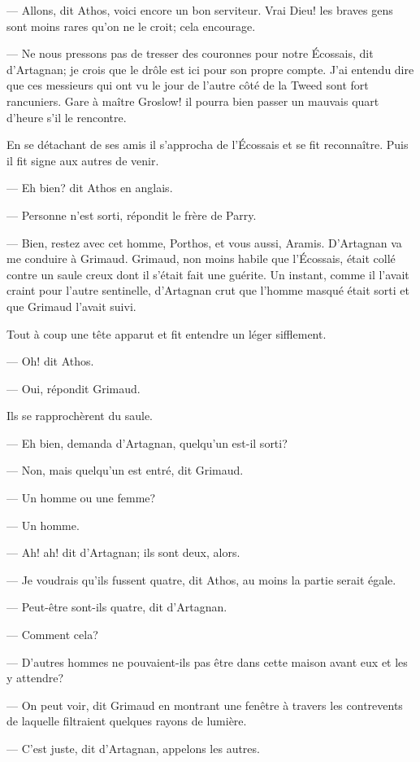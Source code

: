 — Allons, dit Athos, voici encore un bon serviteur. Vrai Dieu! les braves gens sont moins rares qu'on ne le croit; cela encourage.

— Ne nous pressons pas de tresser des couronnes pour notre Écossais, dit d'Artagnan; je crois que le drôle est ici pour son propre compte. J'ai entendu dire que ces messieurs qui ont vu le jour de l'autre côté de la Tweed sont fort rancuniers. Gare à maître Groslow! il pourra bien passer un mauvais quart d'heure s'il le rencontre.

En se détachant de ses amis il s'approcha de l'Écossais et se fit reconnaître. Puis il fit signe aux autres de venir.

— Eh bien? dit Athos en anglais.

— Personne n'est sorti, répondit le frère de Parry.

— Bien, restez avec cet homme, Porthos, et vous aussi, Aramis. D'Artagnan va me conduire à Grimaud.
Grimaud, non moins habile que l'Écossais, était collé contre un saule creux dont il s'était fait une guérite. Un instant, comme il l'avait craint pour l'autre sentinelle, d'Artagnan crut que l'homme masqué était sorti et que Grimaud l'avait suivi.

Tout à coup une tête apparut et fit entendre un léger sifflement.

— Oh! dit Athos.

— Oui, répondit Grimaud.

Ils se rapprochèrent du saule.

— Eh bien, demanda d'Artagnan, quelqu'un est-il sorti?

— Non, mais quelqu'un est entré, dit Grimaud.

— Un homme ou une femme?

— Un homme.

— Ah! ah! dit d'Artagnan; ils sont deux, alors.

— Je voudrais qu'ils fussent quatre, dit Athos, au moins la partie serait égale.

— Peut-être sont-ils quatre, dit d'Artagnan.

— Comment cela?

— D'autres hommes ne pouvaient-ils pas être dans cette maison avant eux et les y attendre?

— On peut voir, dit Grimaud en montrant une fenêtre à travers les contrevents de laquelle filtraient quelques rayons de lumière.

— C'est juste, dit d'Artagnan, appelons les autres.

